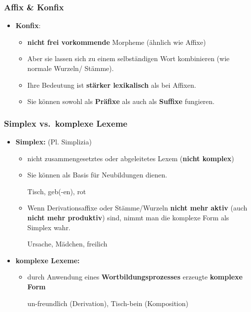 \begin{frame}
\frametitle{Affix \& Konfix}

\begin{itemize}
\item \textbf{Konfix}: 

\begin{itemize}
	\item \textbf{nicht frei vorkommende} Morpheme (ähnlich wie Affixe)
	\item Aber sie lassen sich zu einem selbständigen Wort kombinieren (wie normale Wurzeln/ Stämme).
	
	\ea
		\z 
	\z 
	
	\item Ihre Bedeutung ist \textbf{stärker lexikalisch} als bei Affixen.
	
	\item Sie können sowohl als \textbf{Präfixe} als auch als \textbf{Suffixe} fungieren.
	
		\ea 
			\z 
		\z 
	\end{itemize}
\end{itemize}

\end{frame}


\begin{frame}
\frametitle{Simplex vs.\ komplexe Lexeme}

\begin{itemize}
	\item \textbf{Simplex:} (Pl. Simplizia)
	
	\begin{itemize}
		\item nicht zusammengesetztes oder abgeleitetes Lexem (\textbf{nicht komplex})
		\item Sie können als Basis für Neubildungen dienen.
		
		\ea Tisch, geb(-en), rot
		\z 
		
		\item Wenn Derivationsaffixe oder Stämme/Wurzeln \textbf{nicht mehr aktiv} (auch \textbf{nicht mehr produktiv}) sind, nimmt man die komplexe Form als Simplex wahr.

		\ea Ursache, Mädchen, freilich
		\z 
	\end{itemize}

\pause 

	\item \textbf{komplexe Lexeme:}
	
	\begin{itemize}
		\item durch Anwendung eines \textbf{Wortbildungsprozesses} erzeugte \textbf{komplexe Form}
		
		\ea un-freundlich (Derivation), Tisch-bein (Komposition)
		\z 
	\end{itemize}
\end{itemize}

\end{frame}